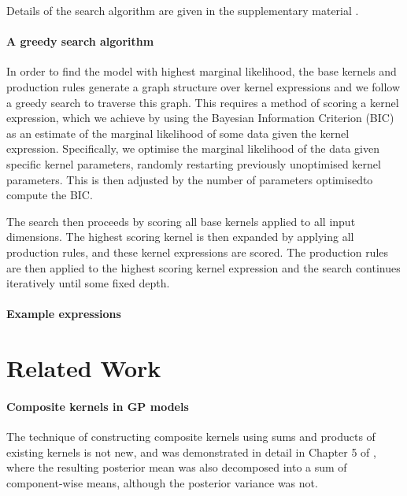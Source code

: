 \documentclass[twoside]{article}
\begin{document}
Details of the search algorithm are given in the supplementary material .

\paragraph{A greedy search algorithm}
In order to find the model with highest marginal likelihood, the base kernels and production rules generate a graph structure over kernel expressions and we follow a greedy search to traverse this graph.
This requires a method of scoring a kernel expression, which we achieve by using the Bayesian Information Criterion (BIC) as an estimate of the marginal likelihood of some data given the kernel expression\footnotemark.
Specifically, we optimise the marginal likelihood of the data given specific kernel parameters, randomly restarting previously unoptimised kernel parameters.
This is then adjusted by the number of parameters optimised\footnotemark to compute the BIC.

The search then proceeds by scoring all base kernels applied to all input dimensions.
The highest scoring kernel is then expanded by applying all production rules, and these kernel expressions are scored.
The production rules are then applied to the highest scoring kernel expression and the search continues iteratively until some fixed depth.

\paragraph{Example expressions}


\section{Related Work}

\paragraph{Composite kernels in GP models} The technique of constructing composite kernels using sums and products of existing kernels is not new, and was demonstrated in detail in Chapter 5 of \cite{rasmussen38gaussian}, where the resulting posterior mean was also decomposed into a sum of component-wise means, although the posterior variance was not.
\end{document}
